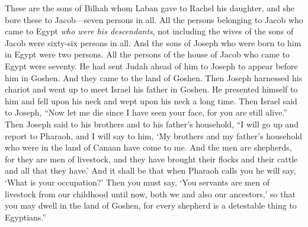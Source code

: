 \begin{biblechapter}
\verse These are the sons of Bilhah whom Laban gave to Rachel his daughter, and she bore these to Jacob—seven persons in all.
\verse All the persons belonging to Jacob who came to Egypt \textit{who were his descendants}, not including the wives of the sons of Jacob were sixty-six persons in all.
\verse And the sons of Joseph who were born to him in Egypt were two persons. All the persons of the house of Jacob who came to Egypt were seventy.
\verse He had sent Judah ahead of him to Joseph to appear before him in Goshen. And they came to the land of Goshen.
\verse Then Joseph harnessed his chariot and went up to meet Israel his father in Goshen. He presented himself to him and fell upon his neck and wept upon his neck a long time.
\verse Then Israel said to Joseph, “Now let me die since I have seen your face, for you are still alive.”
\verse Then Joseph said to his brothers and to his father’s household, “I will go up and report to Pharaoh, and I will say to him, ‘My brothers and my father’s household who were in the land of Canaan have come to me.
\verse And the men are shepherds, for they are men of livestock, and they have brought their flocks and their cattle and all that they have.’
\verse And it shall be that when Pharaoh calls you he will say, ‘What is your occupation?’
\verse Then you must say, ‘You servants are men of livestock from our childhood until now, both we and also our ancestors,’ so that you may dwell in the land of Goshen, for every shepherd is a detestable thing to Egyptians.”
\end{biblechapter}

